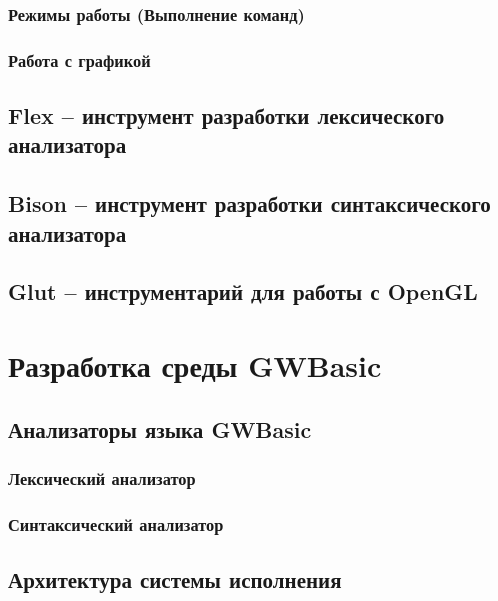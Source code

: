 \documentclass[12pt]{article}
\begin{document}
			\subsubsection{Режимы работы (Выполнение команд)}

			\subsubsection{Работа с графикой}
		\subsection{Flex -- инструмент разработки лексического анализатора}
		\subsection{Bison -- инструмент разработки синтаксического анализатора}
		\subsection{Glut -- инструментарий для работы с OpenGL}
	\newpage
	\section{Разработка среды GWBasic}
		\subsection{Анализаторы языка GWBasic}
			\subsubsection{Лексический анализатор}
			\subsubsection{Синтаксический анализатор}
		\subsection{Архитектура системы исполнения}
\end{document}
